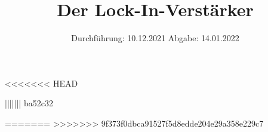 

\subject{VERSUCH 303}
\title{Der Lock-In-Verstärker }
\date{%
  Durchführung: 10.12.2021
  \hspace{3em}
  Abgabe: 14.01.2022
}



\maketitle
\thispagestyle{empty}
\tableofcontents
\newpage






<<<<<<< HEAD

||||||| ba52c32

=======
>>>>>>> 9f373f0dbca91527f5d8edde204e29a358e229c7

\printbibliography{}


